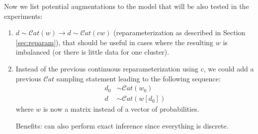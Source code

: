 Now we list potential augmentations to the model that will be also tested in the experiments:
\begin{enumerate}
    \item $d \sim \mathcal{C}at(w) \rightarrow d \sim \mathcal{C}at(cw)$ (reparameterization as described in Section \ref{sec:reparam}), that should be useful in cases where the resulting $w$ is imbalanced (or there is little data for one cluster).
    \item Instead of the previous continuous reparameterization using $c$, we could add a previous $\mathcal{C}at$ sampling statement leading to the following sequence:
    \begin{align*}
        d_0 &\sim \mathcal{C}at(w_0) \\
        d &\sim \mathcal{C}at(w\left[d_0\right])
    \end{align*}
    where $w$ is now a matrix instead of a vector of probabilities.
    
    
    Benefits: can also perform exact inference since everything is discrete.
\end{enumerate}
\fi












